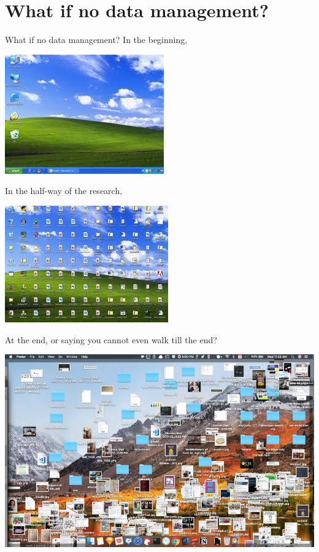 \documentclass{beamer}
\begin{document}
\section{What if no data management?}
\begin{frame}[allowframebreaks]{What if no data management?}
In the beginning, 
\begin{center}
		\includegraphics{image/desktop}
\end{center}

\newpage
In the half-way of the research, \\
\begin{center}
		\includegraphics{image/messy-desktop}
\end{center}

\newpage
At the end, or saying you cannot even walk till the end?

\begin{center}
		\includegraphics[scale=0.3]{image/more-messy-desktop}
\end{center}


\end{frame}
\end{document}

